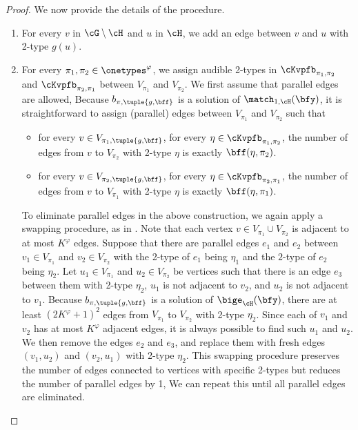 \begin{proof}
    We now provide the details of the procedure.
    \begin{enumerate}
        \item 
            For every $v$ in $\cG \setminus \cH$  and $u$ in $\cH$,
            we add an edge between $v$ and $u$ with 2-type $g(u)$.
        \item
            For every $\pi_1, \pi_2 \in \onetypes^\varphi$,
            we assign audible 2-types in $\cKvpfb_{\pi_1, \pi_2}$ and $\cKvpfb_{\pi_2, \pi_1}$
            between $V_{\pi_1}$ and $V_{\pi_2}$.
            We first assume that parallel edges are allowed,
            Because $b_{\pi, \tuple{g, \bff}}$ is a solution of $\match_{1, \cH}(\bfy)$,
            it is straightforward to assign (parallel) edges between $V_{\pi_1}$ and $V_{\pi_2}$ 
            such that
            \begin{itemize}
            \item
                for every $v \in V_{\pi_1, \tuple{g, \bff}}$, for every $\eta \in \cKvpfb_{\pi_1, \pi_2}$,
                the number of edges from $v$ to $V_{\pi_2}$ with 2-type $\eta$ is exactly $\bff(\eta, \pi_2)$.
            \item
                for every $v \in V_{\pi_2, \tuple{g, \bff}}$, for every $\eta \in \cKvpfb_{\pi_2, \pi_1}$,
                the number of edges from $v$ to $V_{\pi_1}$ with 2-type $\eta$ is exactly $\bff(\eta, \pi_1)$.
            \end{itemize}

            To eliminate parallel edges in the above construction,
            we again apply a swapping procedure, as in \cite{tonyeryk,ultimatelyperiodic}.
            Note that each vertex $v \in V_{\pi_1} \cup V_{\pi_2}$ is adjacent to at most $K^\varphi$ edges.
            Suppose that there are parallel edges $e_1$ and $e_2$
            between $v_1 \in V_{\pi_1}$ and $v_2 \in V_{\pi_2}$ with the 2-type of $e_1$ being $\eta_1$ and
            the $2$-type of $e_2$ being $\eta_2$.
            Let $u_1 \in V_{\pi_1}$ and $u_2 \in V_{\pi_2}$ be vertices such that
            there is an edge $e_3$ between them with 2-type $\eta_2$,
            $u_1$ is not adjacent to $v_2$, and
            $u_2$ is not adjacent to $v_1$.
            Because $b_{\pi, \tuple{g, \bff}}$ is a solution of $\bige_{\cH}(\bfy)$,
            there are at least $(2K^\varphi+1)^2$ edges from $V_{\pi_1}$ to $V_{\pi_2}$ with 2-type $\eta_2$.
            Since each of $v_1$ and $v_2$ has at most $K^\varphi$ adjacent edges,
            it is always possible to find such $u_1$ and $u_2$.
            We then remove the edges $e_2$ and $e_3$,
            and replace them with fresh edges $(v_1, u_2)$ and $(v_2, u_1)$ with 2-type $\eta_2$.
            This swapping procedure preserves the number of edges connected to vertices with specific 2-types
            but reduces the number of parallel edges by 1,
            We can repeat this until all parallel edges are eliminated.


\end{enumerate}
\end{proof}
